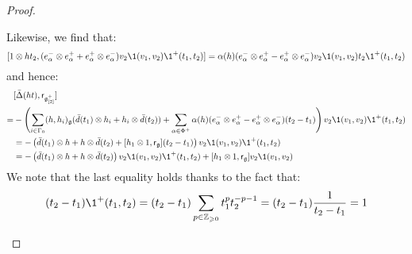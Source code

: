 \begin{proof}
\begin{enumerate}
\begin{enumerate}
                        Likewise, we find that:
                            $$[1 \tensor h t_2, (e_{\alpha}^- \tensor e_{\alpha}^+ + e_{\alpha}^+ \tensor e_{\alpha}^-) v_2\1(v_1, v_2) \1^+(t_1, t_2)] = \alpha(h) ( e_{\alpha}^- \tensor e_{\alpha}^+ - e_{\alpha}^+ \tensor e_{\alpha}^- ) v_2 \1(v_1, v_2) t_2 \1^+(t_1, t_2)$$
                        and hence:
                            $$
                                \begin{aligned}
                                    & [\bar{\Delta}(ht), \sfr_{\g_{[2]}^+}]
                                    \\
                                    = & -\left( \sum_{i \in \Gamma_0} (h, h_i)_{\g} ( \bar{d}(t_1) \tensor h_i + h_i \tensor \bar{d}(t_2) ) + \sum_{\alpha \in \Phi^+} \alpha(h) ( e_{\alpha}^- \tensor e_{\alpha}^+ - e_{\alpha}^+ \tensor e_{\alpha}^- )(t_2 - t_1) \right) v_2 \1(v_1, v_2) \1^+(t_1, t_2)
                                    \\
                                    & = -\left( \bar{d}(t_1) \tensor h + h \tensor \bar{d}(t_2) + [h_1 \tensor 1, \sfr_{\g}] (t_2 - t_1) \right) v_2 \1(v_1, v_2) \1^+(t_1, t_2)
                                    \\
                                    & = -\left( \bar{d}(t_1) \tensor h + h \tensor \bar{d}(t_2) \right) v_2 \1(v_1, v_2) \1^+(t_1, t_2) + [h_1 \tensor 1, \sfr_{\g}] v_2 \1(v_1, v_2)
                                \end{aligned}
                            $$
                        We note that the last equality holds thanks to the fact that:
                            $$(t_2 - t_1) \1^+(t_1, t_2) = (t_2 - t_1) \sum_{p \in \Z_{\geq 0}} t_1^p t_2^{-p - 1} = (t_2 - t_1) \frac{1}{t_2 - t_1} = 1$$
                            

\end{enumerate}
\end{enumerate}
\end{proof}
